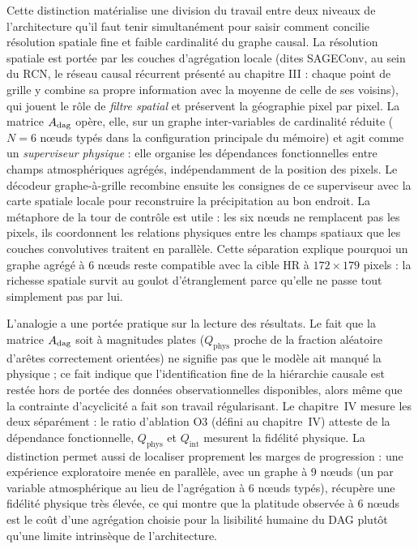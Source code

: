 Cette distinction matérialise une division du travail entre deux niveaux de l'architecture qu'il faut tenir simultanément pour saisir comment \Oracle{} concilie résolution spatiale fine et faible cardinalité du graphe causal. La résolution spatiale est portée par les couches d'agrégation locale (dites SAGEConv, au sein du RCN, le réseau causal récurrent présenté au chapitre III : chaque point de grille y combine sa propre information avec la moyenne de celle de ses voisins), qui jouent le rôle de \emph{filtre spatial} et préservent la géographie pixel par pixel. La matrice $A_{\mathrm{dag}}$ opère, elle, sur un graphe inter-variables de cardinalité réduite ($N = 6$ nœuds typés dans la configuration principale du mémoire) et agit comme un \emph{superviseur physique} : elle organise les dépendances fonctionnelles entre champs atmosphériques agrégés, indépendamment de la position des pixels. Le décodeur graphe-à-grille recombine ensuite les consignes de ce superviseur avec la carte spatiale locale pour reconstruire la précipitation au bon endroit. La métaphore de la tour de contrôle est utile : les six nœuds ne remplacent pas les pixels, ils coordonnent les relations physiques entre les champs spatiaux que les couches convolutives traitent en parallèle. Cette séparation explique pourquoi un graphe agrégé à 6 nœuds reste compatible avec la cible HR à $172 \times 179$ pixels : la richesse spatiale survit au goulot d'étranglement parce qu'elle ne passe tout simplement pas par lui.

L'analogie a une portée pratique sur la lecture des résultats. Le fait que la matrice $A_{\mathrm{dag}}$ soit à magnitudes plates ($Q_{\mathrm{phys}}$ proche de la fraction aléatoire d'arêtes correctement orientées) ne signifie pas que le modèle ait manqué la physique ; ce fait indique que l'identification fine de la hiérarchie causale est restée hors de portée des données observationnelles disponibles, alors même que la contrainte d'acyclicité a fait son travail régularisant. Le chapitre~IV mesure les deux séparément : le ratio d'ablation O3 (défini au chapitre~IV) atteste de la dépendance fonctionnelle, $Q_{\mathrm{phys}}$ et $Q_{\mathrm{int}}$ mesurent la fidélité physique. La distinction permet aussi de localiser proprement les marges de progression : une expérience exploratoire menée en parallèle, avec un graphe à 9 nœuds (un par variable atmosphérique au lieu de l'agrégation à 6 nœuds typés), récupère une fidélité physique très élevée, ce qui montre que la platitude observée à 6 nœuds est le coût d'une agrégation choisie pour la lisibilité humaine du DAG plutôt qu'une limite intrinsèque de l'architecture.

